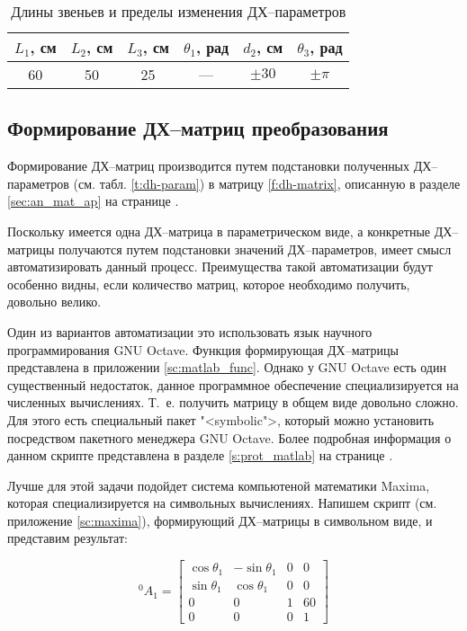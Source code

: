 \documentclass[oneside, final, 14pt]{extarticle}
\begin{document}
\begin{table}[h]
\centering
\begin{tabular}{|c|c|c|c|c|c|}
  \hline  \(L_1\), см & \(L_2\), см & \(L_3\), см & \(\theta_1\), рад & \(d_2\), см & \(\theta_3\), рад \\ \hline
  60 & 50 & 25 & --- & \(\pm 30\) & \(\pm \pi\) \\ \hline
\end{tabular}
\caption{Длины звеньев и пределы изменения ДХ--параметров}
\label{t:var-param}
\end{table}

\subsection{Формирование ДХ--матриц преобразования}

Формирование ДХ--матриц производится путем подстановки полученных ДХ--параметров (см. табл. \ref{t:dh-param}) в матрицу \ref{f:dh-matrix}, описанную в разделе \ref{sec:an_mat_ap} на странице \pageref{f:dh-matrix}.
\par
Поскольку имеется одна ДХ--матрица в параметрическом виде, а конкретные ДХ--матрицы получаются путем подстановки значений ДХ--параметров, имеет смысл автоматизировать данный процесс.
Преимущества такой автоматизации будут особенно видны, если количество матриц, которое необходимо получить, довольно велико.
\par
Один из вариантов автоматизации это использовать язык научного программирования GNU Octave.
Функция формирующая ДХ--матрицы представлена в приложении \ref{sc:matlab_func}.
Однако у GNU Octave есть один существенный недостаток, данное программное обеспечение специализируется на численных вычислениях.
Т.~е. получить матрицу в общем виде довольно сложно.
Для этого есть специальный пакет "<symbolic">, который можно установить посредством пакетного менеджера GNU Octave.
Более подробная информация о данном скрипте представлена в разделе \ref{s:prot_matlab} на странице \pageref{s:prot_matlab}.
\par
Лучше для этой задачи подойдет система компьютеной математики Maxima, которая специализируется на символьных вычислениях.
Напишем скрипт (см. приложение \ref{sc:maxima}), формирующий ДХ--матрицы в символьном виде, и представим результат:

\begin{displaymath}
  {}^0A_1 = 
  \begin{bmatrix}
    \cos{\theta_1} & -\sin{\theta_1} & 0 & 0 \\
	\sin{\theta_1} & \cos{\theta_1} & 0 & 0 \\
	0 & 0 & 1 & 60 \\
	0 & 0 & 0 & 1
  \end{bmatrix}
\end{displaymath}
\end{document}
